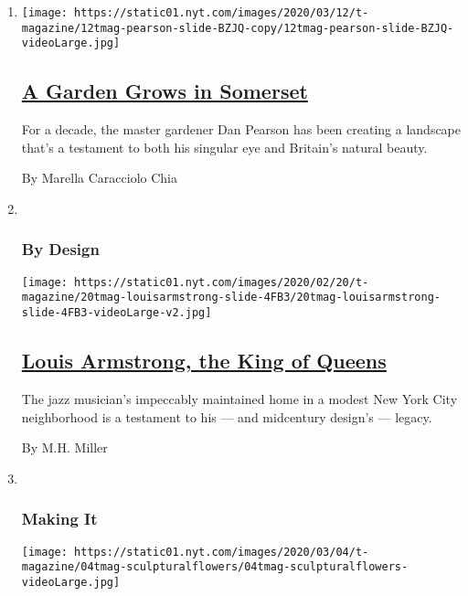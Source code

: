 \begin{enumerate}
\def\labelenumi{\arabic{enumi}.}
\item
  \texttt{[image: https://static01.nyt.com/images/2020/03/12/t-magazine/12tmag-pearson-slide-BZJQ-copy/12tmag-pearson-slide-BZJQ-videoLarge.jpg]}

  \hypertarget{a-garden-grows-in-somerset}{%
  \subsection{\texorpdfstring{\href{/2020/03/12/t-magazine/master-gardener-dan-pearson.html}{A
  Garden Grows in
  Somerset}}{A Garden Grows in Somerset}}\label{a-garden-grows-in-somerset}}

  For a decade, the master gardener Dan Pearson has been creating a
  landscape that's a testament to both his singular eye and Britain's
  natural beauty.

  By Marella Caracciolo Chia
\item ~
  \hypertarget{by-design}{%
  \subsubsection{By Design}\label{by-design}}

  \texttt{[image: https://static01.nyt.com/images/2020/02/20/t-magazine/20tmag-louisarmstrong-slide-4FB3/20tmag-louisarmstrong-slide-4FB3-videoLarge-v2.jpg]}

  \hypertarget{louis-armstrong-the-king-of-queens}{%
  \subsection{\texorpdfstring{\href{/2020/02/20/t-magazine/louis-armstrong-home-queens.html}{Louis
  Armstrong, the King of
  Queens}}{Louis Armstrong, the King of Queens}}\label{louis-armstrong-the-king-of-queens}}

  The jazz musician's impeccably maintained home in a modest New York
  City neighborhood is a testament to his --- and midcentury design's
  --- legacy.

  By M.H. Miller
\item ~
  \hypertarget{making-it}{%
  \subsubsection{Making It}\label{making-it}}

  \texttt{[image: https://static01.nyt.com/images/2020/03/04/t-magazine/04tmag-sculpturalflowers/04tmag-sculpturalflowers-videoLarge.jpg]}


\end{enumerate}
